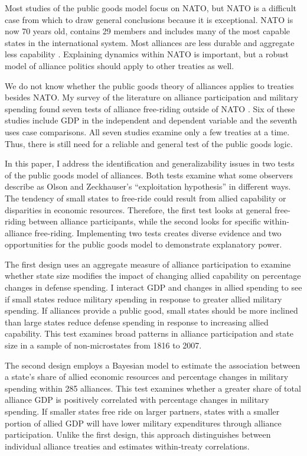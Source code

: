 \documentclass[12pt]{article}
\begin{document}
Most studies of the public goods model focus on NATO, but NATO is a difficult case from which to draw general conclusions because it is exceptional. 
NATO is now 70 years old, contains 29 members and includes many of the most capable states in the international system. 
Most alliances are less durable and aggregate less capability \citep{Leedsetal2002}. 
Explaining dynamics within NATO is important, but a robust model of alliance politics should apply to other treaties as well. 


We do not know whether the public goods theory of alliances applies to treaties besides NATO. 
My survey of the literature on alliance participation and military spending found seven tests of alliance free-riding outside of NATO \citep{Russett1970, Starr1974, Reisinger1983, Thies1987, ConybeareSandler1990, OnealWhatley1996, Siroky2012}. 
Six of these studies include GDP in the independent and dependent variable and the seventh uses case comparisons.
All seven studies examine only a few treaties at a time. 
Thus, there is still need for a reliable and general test of the public goods logic. 


In this paper, I address the identification and generalizability issues in two tests of the public goods model of alliances.  
Both tests examine what some observers describe as Olson and Zeckhauser's ``exploitation hypothesis'' in different ways.   
The tendency of small states to free-ride could result from allied capability or disparities in economic resources.
Therefore, the first test looks at general free-riding between alliance participants, while the second looks for specific within-alliance free-riding. 
Implementing two tests creates diverse evidence and two opportunities for the public goods model to demonstrate explanatory power. 


The first design uses an aggregate measure of alliance participation to examine whether state size modifies the impact of changing allied capability on percentage changes in defense spending.
I interact GDP and changes in allied spending to see if small states reduce military spending in response to greater allied military spending. 
If alliances provide a public good, small states should be more inclined than large states reduce defense spending in response to increasing allied capability. 
This test examines broad patterns in alliance participation and state size in a sample of non-microstates from 1816 to 2007. 


The second design employs a Bayesian model to estimate the association between a state's share of allied economic resources and percentage changes in military spending within 285 alliances. 
This test examines whether a greater share of total alliance GDP is positively correlated with percentage changes in military spending. 
If smaller states free ride on larger partners, states with a smaller portion of allied GDP will have lower military expenditures through alliance participation.
Unlike the first design, this approach distinguishes between individual alliance treaties and estimates within-treaty correlations. 
\end{document}
